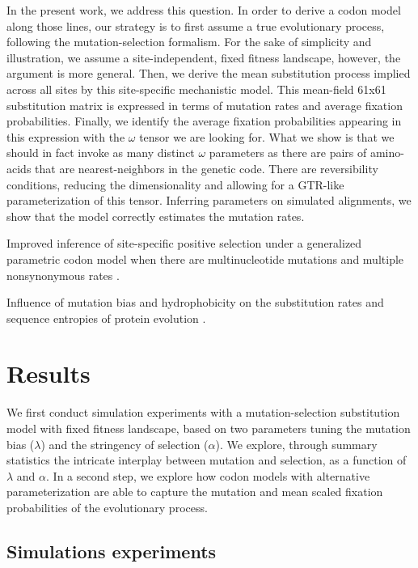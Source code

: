 In the present work, we address this question.
In order to derive a codon model along those lines, our strategy is to first assume a true evolutionary process, following the mutation-selection formalism.
For the sake of simplicity and illustration, we assume a site-independent, fixed fitness landscape, however, the argument is more general.
Then, we derive the mean substitution process implied across all sites by this site-specific mechanistic model.
This mean-field 61x61 substitution matrix is expressed in terms of mutation rates and average fixation probabilities.
Finally, we identify the average fixation probabilities appearing in this expression with the $\omega$ tensor we are looking for.
What we show is that we should in fact invoke as many distinct $\omega$ parameters as there are pairs of amino-acids that are nearest-neighbors in the genetic code.
There are reversibility conditions, reducing the dimensionality and allowing for a GTR-like parameterization of this tensor.
Inferring parameters on simulated alignments, we show that the model correctly estimates the mutation rates.

Improved inference of site-specific positive selection under a generalized parametric codon model when there are multinucleotide mutations and multiple nonsynonymous rates \citep{Dunn2019}.

Influence of mutation bias and hydrophobicity on the substitution rates and sequence entropies of protein evolution \citep{Santos2018}.

\section{Results}

We first conduct simulation experiments with a mutation-selection substitution model with fixed fitness landscape, based on two parameters tuning the mutation bias ($\lambda$) and the stringency of selection ($\alpha$).
We explore, through summary statistics the intricate interplay between mutation and selection, as a function of $\lambda$ and $\alpha$.
In a second step, we explore how codon models with alternative parameterization are able to capture the mutation and mean scaled fixation probabilities of the evolutionary process.

\subsection{Simulations experiments}

